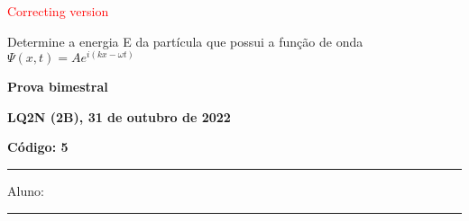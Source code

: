 \documentclass[12pt, addpoints]{exam}
\begin{document}
        \begin{center}
\textcolor{red}{\emph\Large Correcting version}\end{center}
\begin{questions}
\begin{multicols*}{2}
\question[20] Determine a energia E da partícula que possui a função de onda $\Psi(x,t)=Ae^{i(kx-\omega t)}$

\begin{oneparchoices}
\end{oneparchoices}
\end{multicols*}
\end{questions}
\newpage
        \begin{minipage}[b]{0.75\linewidth}
            \begin{flushleft}
                {\bf \large Prova bimestral}
            \end{flushleft}
            \begin{flushleft}
                {\bf \large LQ2N (2B), 31 de outubro de 2022}
            \end{flushleft}
        \end{minipage}
        \begin{minipage}[b]{0.20\linewidth}
            \begin{flushright}
                {\bf \large Código: 5}
            \end{flushright}
        \end{minipage}
        \vspace{0.5cm} \hrule \vspace{0.5cm}
        \begin{minipage}{0.75\linewidth}
            Aluno:
        \end{minipage}
        \vspace{0.5cm} \hrule \vspace{0.5cm}
\end{document}
